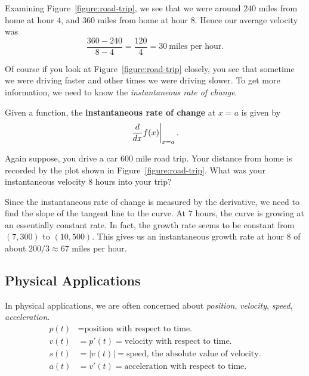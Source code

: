 \begin{solution}
Examining Figure~\ref{figure:road-trip}, we see that we were around
$240$ miles from home at hour $4$, and $360$ miles from home at hour
$8$. Hence our average velocity was
\[
\frac{360-240}{8-4} = \frac{120}{4} = 30~\text{miles per hour.}
\]
\end{solution}

Of course if you look at Figure~\ref{figure:road-trip} closely, you
see that sometime we were driving faster and other times we were
driving slower. To get more information, we need to know the
\textit{instantaneous rate of change}.

\begin{definition}
Given a function, the \textbf{instantaneous rate of change} at $x=a$ is given by
\[
\left.\frac{d}{dx} f(x) \right|_{x=a}.
\] 
\end{definition}

\begin{example} 
Again suppose, you drive a car 600 mile road trip. Your distance from
home is recorded by the plot shown in
Figure~\ref{figure:road-trip}. What was your instantaneous velocity
$8$ hours into your trip?
\end{example}
\begin{solution}
Since the instantaneous rate of change is measured by the derivative,
we need to find the slope of the tangent line to the curve. At $7$
hours, the curve is growing at an essentially constant rate. In fact,
the growth rate seems to be constant from $(7,300)$ to
$(10,500)$. This gives us an instantaneous growth rate at hour $8$ of
about $200/3 \approx 67$ miles per hour.
\end{solution}




\subsection*{Physical Applications}

In physical applications, we are often concerned about
\textit{position}, \textit{velocity}, \textit{speed},
\textit{acceleration}.
\begin{align*}
p(t) &= \text{position with respect to time.}\\
v(t) &= p'(t) = \text{velocity with respect to time.}\\
s(t) &= |v(t)| = \text{speed, the absolute value of velocity.}\\
a(t) &=v'(t) = \text{acceleration with respect to time.}
\end{align*}

